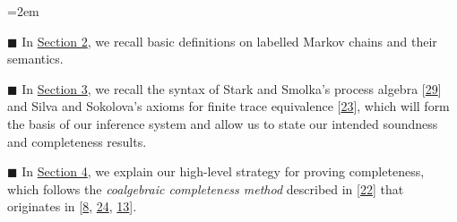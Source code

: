 \documentclass[11pt,a4paper]{amsart}
\begin{document}
\begin{list}{}{\leftmargin=2em}
\hypertarget{html:S1.I1.i1}{}
\item[]  %
\hypertarget{html:S1.I1.i1.m1}{}\({\blacksquare}\) %
\hypertarget{html:S1.I1.i1.p1}{} In \hyperlink{html:S2}{Section 2}, we recall basic definitions on labelled Markov chains and their semantics.
\par\medskip
  
\hypertarget{html:S1.I1.i2}{}
\item[]  %
\hypertarget{html:S1.I1.i2.m1}{}\({\blacksquare}\) %
\hypertarget{html:S1.I1.i2.p1}{} In \hyperlink{html:S3}{Section 3}, we recall the syntax of Stark and Smolka’s process algebra [\hyperlink{html:bib.bib29}{29}] and Silva and Sokolova’s axioms for finite trace equivalence [\hyperlink{html:bib.bib23}{23}], which will form the basis of our inference system and allow us to state our intended soundness and completeness results.
\par\medskip
  
\hypertarget{html:S1.I1.i3}{}
\item[]  %
\hypertarget{html:S1.I1.i3.m1}{}\({\blacksquare}\) %
\hypertarget{html:S1.I1.i3.p1}{} In \hyperlink{html:S4}{Section 4}, we explain our high-level strategy for proving completeness, which follows the \emph{coalgebraic completeness method} described in [\hyperlink{html:bib.bib22}{22}] that originates in [\hyperlink{html:bib.bib8}{8}, \hyperlink{html:bib.bib24}{24}, \hyperlink{html:bib.bib13}{13}].
\par\medskip
  

\end{list}
\end{document}
